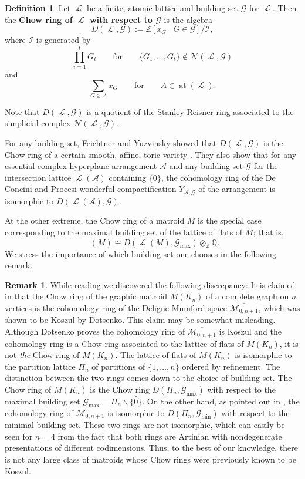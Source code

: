 \documentclass[11pt, reqno]{amsart}
\DeclareMathOperator{\at}{at}					%
\renewcommand{\bar}[1]{\overline{#1}}
\DeclareMathOperator{\Chow}{\underline{CH}}		%
\renewcommand{\hat}[1]{\widehat{#1}}
\newcommand{\iso}{\cong}
\DeclareMathOperator{\LL}{\mathcal{L}}
\renewcommand{\setminus}{\smallsetminus}
\newcommand{\tensor}{\otimes}
\newcommand{\term}[1]{\textbf{\textsf{#1}}}
\theoremstyle{definition}
\newtheorem{defn}[thm]{Definition}
\newtheorem{rmk}[thm]{Remark}
\numberwithin{equation}{section}
\numberwithin{table}{section}
\begin{document}
\begin{spacing}{1.1}
\begin{defn} Let $\LL$ be a finite, atomic lattice and building set $\mathcal{G}$ for $\LL$.  Then the \term{Chow ring of $\LL$ with respect to $\mathcal{G}$} is the algebra
\[D(\LL,\mathcal{G}) := \mathbb{Z}[x_G\mid G \in \mathcal{G}]/\mathcal{I},\]
where $\mathcal{I}$ is generated by
\[ \prod_{i = 1}^t G_i \qquad \text{for} \qquad \{G_1,\ldots,G_t\} \notin \mathcal{N}(\LL,\mathcal{G})\]
and
\[\sum_{G \ge A} x_G \qquad \text{for} \qquad A \in \at(\LL).\]
\end{defn}
\noindent Note that $D(\LL,\mathcal{G})$ is a quotient of the Stanley-Reisner ring associated to the simplicial complex $\mathcal{N}(\LL,\mathcal{G})$. 

For any building set, Feichtner and Yuzvinsky showed that $D(\LL,\mathcal{G})$ is the Chow ring of a certain smooth, affine, toric variety \cite[Theorem~3]{FY04}.  They also show that for any essential complex hyperplane arrangement $\mathcal{A}$ and any building set $\mathcal{G}$ for the intersection lattice $\LL(\mathcal{A})$ containing $\{0\}$, the cohomology ring of the De Concini and Procesi wonderful compactification $\bar{Y}_{\mathcal{A}, \mathcal{G}}$ of the arrangement \cite{DP95b, DP95a} is isomorphic to $D(\LL(\mathcal{A}),\mathcal{G})$.  

At the other extreme, the Chow ring of a matroid $M$ is the special case corresponding to the maximal building set of the lattice of flats of $M$; that is,
\[\Chow(M) \iso D(\LL(M),\mathcal{G}_{\mathrm{max}}) \tensor_\mathbb{Z} \mathbb{Q}.\]
We stress the importance of which building set one chooses in the following remark. 

\begin{rmk}\label{chow:remark} While reading \cite{BES20} we discovered the following discrepancy:
It is claimed in \cite[Remark 3.2.2]{BES20} that the Chow ring of the graphic matroid $M(K_n)$ of a complete graph on $n$ vertices is the cohomology ring of the Deligne-Mumford space $\bar{\mathcal{M}_{0, n+1}}$, which was shown to be Koszul by Dotsenko.  This claim may be somewhat misleading.  Although Dotsenko proves the cohomology ring of $\bar{\mathcal{M}_{0, n+1}}$ is Koszul \cite{Dot20} and the cohomology ring is a Chow ring associated to the lattice of flats of $M(K_n)$, it is not \emph{the} Chow ring of $M(K_n)$.  The lattice of flats of $M(K_n)$ is isomorphic to the partition lattice $\Pi_n$ of partitions of $\{1, \dots, n\}$ ordered by refinement. The distinction between the two rings comes down to the choice of building set. The Chow ring of $M(K_n)$ is the Chow ring $D(\Pi_n, \mathcal{G}_{\max})$ with respect to the maximal building set $\mathcal{G}_{\max} = \Pi_n \setminus \{\hat{0}\}$.  On the other hand, as pointed out in \cite[\S 7]{FY04}, the cohomology ring of $\bar{\mathcal{M}_{0, n+1}}$ is isomorphic to $D(\Pi_n, \mathcal{G}_{\min})$ with respect to the minimal building set.  These two rings are not isomorphic, which can easily be seen for $n = 4$ from the fact that both rings are Artinian with nondegenerate presentations of different codimensions.  Thus, to the best of our knowledge, there is not any large class of matroids whose Chow rings were previously known to be Koszul.
\end{rmk}


\end{spacing}
\end{document}
